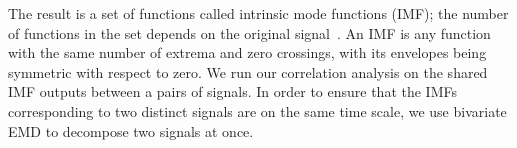 The result is a set of functions called intrinsic mode functions (IMF); the number of functions in 
the set depends on the original signal~\cite{emd_process}.  An IMF is any 
function with the same number of extrema and zero crossings, with its envelopes being symmetric with respect to zero.
We run our correlation analysis on the shared IMF outputs between a pairs of signals.  In order to ensure 
that the IMFs corresponding to two distinct signals are on the same time scale, we use 
bivariate EMD \cite{rilling:biemd2007} to decompose two signals at once. 
